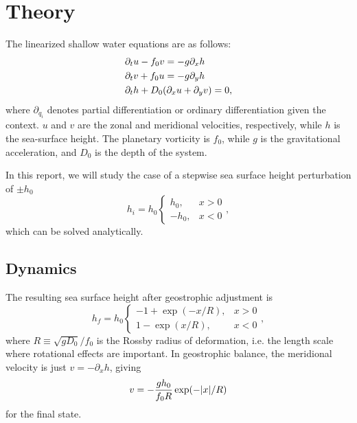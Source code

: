 \section{Theory}
\label{sec:theory}

The linearized shallow water equations are as follows:
	\begin{align}
		&\partial_t u - f_0 v = -g \partial_x h \label{eq:dudt} \\
		&\partial_t v + f_0 u = -g \partial_y h \label{eq:dvdt} \\
		&\partial_t h + D_0 \qty(\partial_x u + \partial_y v) = 0, \label{eq:dhdt}
	\end{align}
where $\partial_{q_i}$ denotes partial differentiation or ordinary differentiation given the context. $u$ and $v$ are the zonal and meridional velocities, respectively, while $h$ is the sea-surface height. The planetary vorticity is $f_0$, while $g$ is the gravitational acceleration, and $D_0$ is the depth of the system. 

In this report, we will study the case of a stepwise sea surface height perturbation of $\pm h_0$
	\begin{equation}
		h_i = h_0
			\begin{cases}
			h_0, & x > 0 \\
			-h_0, & x < 0
			\end{cases},
	\label{eq:initial_h}
	\end{equation}
which can be solved analytically.

\subsection{Dynamics}
The resulting sea surface height after geostrophic adjustment is
	\begin{equation}
		h_f = h_0
			\begin{cases}
				-1 + \exp(-x / R), & x > 0\\
				1 - \exp(x / R), & x < 0
			\end{cases},
	\label{eq:analytical_h}
	\end{equation}
where $R \equiv \sqrt{gD_0} / f_0$ is the Rossby radius of deformation, i.e. the length scale where rotational effects are important. In geostrophic balance, the meridional velocity is just $v = -\partial_x h$, giving
	\begin{equation}
		v = -\frac{g h_0}{f_0R} \exp(-\abs{x} / R)
	\label{analytical_v}
	\end{equation}
for the final state.

